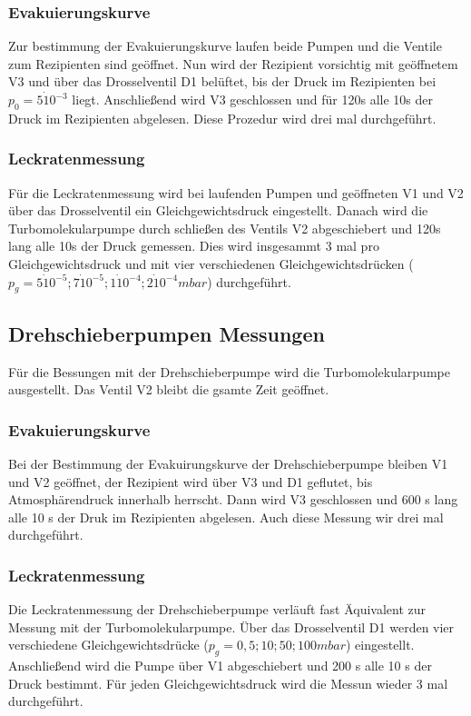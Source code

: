 \subsubsection{Evakuierungskurve}
\label{sec:Evakuierungskurve1}
Zur bestimmung der Evakuierungskurve laufen beide Pumpen und die Ventile zum Rezipienten sind geöffnet.
Nun wird der Rezipient vorsichtig mit geöffnetem V3 und über das Drosselventil D1 belüftet, bis der Druck im Rezipienten bei $p_0 = 5 \dot 10^{-3}$ liegt.
Anschließend wird V3 geschlossen und für 120s alle 10s der Druck im Rezipienten abgelesen.
Diese Prozedur wird drei mal durchgeführt.

\subsubsection{Leckratenmessung}
\label{sec:Leckratenmessung1}
Für die Leckratenmessung wird bei laufenden Pumpen und geöffneten V1 und V2 über das Drosselventil ein Gleichgewichtsdruck eingestellt.
Danach wird die Turbomolekularpumpe durch schließen des Ventils V2 abgeschiebert und 120s lang alle 10s der Druck gemessen.
Dies wird insgesammt 3 mal pro Gleichgewichtsdruck und mit vier verschiedenen Gleichgewichtsdrücken ($p_g = 5 \dot 10^{-5}; 7 \dot 10^{-5}; 1 \dot 10^{-4}; 2 \dot 10^{-4} mbar$) durchgeführt.

\subsection{Drehschieberpumpen Messungen}
\label{sec:Drehschieberpumpen Messungen}
Für die Bessungen mit der Drehschieberpumpe wird die Turbomolekularpumpe ausgestellt. Das Ventil V2 bleibt die gsamte Zeit geöffnet.

\subsubsection{Evakuierungskurve}
\label{sec:Evakuierungskurve2}
Bei der Bestimmung der Evakuirungskurve der Drehschieberpumpe bleiben V1 und V2 geöffnet, der Rezipient wird über V3 und D1 geflutet, 
bis Atmosphärendruck innerhalb herrscht. Dann wird V3 geschlossen und 600 s lang alle 10 s der Druk im Rezipienten abgelesen.
Auch diese Messung wir drei mal durchgeführt.

\subsubsection{Leckratenmessung}
\label{sec:Leckratenmessung2}
Die Leckratenmessung der Drehschieberpumpe verläuft fast Äquivalent zur Messung mit der Turbomolekularpumpe.
Über das Drosselventil D1 werden vier verschiedene Gleichgewichtsdrücke ($p_g = 0,5; 10; 50; 100 mbar$) eingestellt.
Anschließend wird die Pumpe über V1 abgeschiebert und 200 s alle 10 s der Druck bestimmt. Für jeden Gleichgewichtsdruck 
wird die Messun wieder 3 mal durchgeführt.


